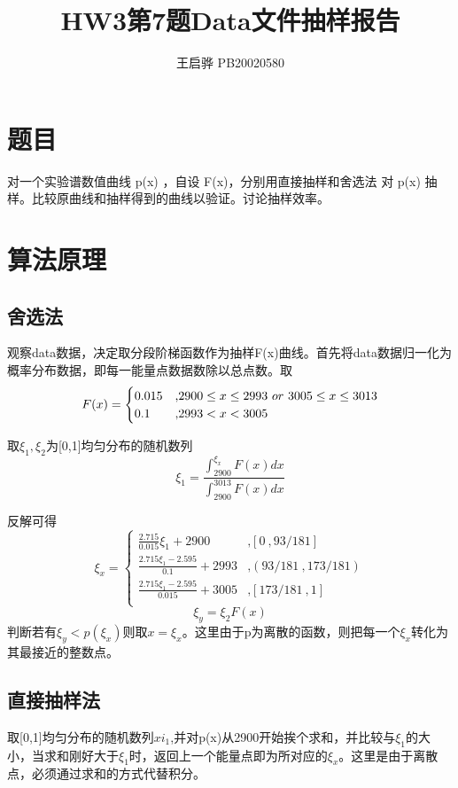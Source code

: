 \documentclass{article}
\title{\songti \zihao{2}\bfseries HW3第7题Data文件抽样报告}
\author{王启骅 PB20020580}
\begin{document}
	\maketitle
	\section{题目}
对一个实验谱数值曲线 p(x) ，自设 F(x)，分别用直接抽样和舍选法
对 p(x) 抽样。比较原曲线和抽样得到的曲线以验证。讨论抽样效率。
	\section{算法原理}
	\subsection{舍选法}
观察data数据，决定取分段阶梯函数作为抽样F(x)曲线。首先将data数据归一化为概率分布数据，即每一能量点数据数除以总点数。取
\begin{equation}
	F(x)=
	\begin{cases}
		0.015& \text{,$2900\le x\le 2993 \ or \ 3005\le x \le 3013 $}\\
		0.1& \text{,$ 2993<x<3005 $}
	\end{cases}
\end{equation}


取$ \xi_1,\xi_2 $为[0,1]均匀分布的随机数列
\begin{equation}
	\xi_1=\frac{\int_{2900}^{\xi_x}F(x)dx}{\int_{2900}^{3013}F(x)dx}
\end{equation}


反解可得
\begin{equation}
	\xi_x=
	\begin{cases}
		\frac{2.715}{0.015}\xi_1+2900& \text{,$[0\ ,93/181] $}\\
		\frac{2.715\xi_1-2.595}{0.1}+2993& \text{,$(93/181\ ,173/181) $}\\
		\frac{2.715\xi_1-2.595}{0.015}+3005& \text{,$[173/181\ ,1] $}\\
	\end{cases}
\end{equation}
\begin{equation}
	\xi_y=\xi_2F(x)
\end{equation}
判断若有$ \xi_y<p(\xi_x) $则取$ x=\xi_x $。这里由于p为离散的函数，则把每一个$ \xi_x $转化为其最接近的整数点。
\subsection{直接抽样法}
取[0,1]均匀分布的随机数列$ xi_1 $,并对p(x)从2900开始挨个求和，并比较与$ \xi_1 $的大小，当求和刚好大于$ \xi_1 $时，返回上一个能量点即为所对应的$ \xi_x $。这里是由于离散点，必须通过求和的方式代替积分。
\end{document}
